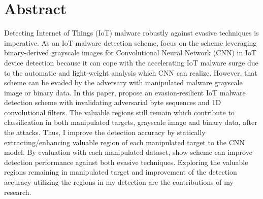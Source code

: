 \section*{Abstract}


Detecting Internet of Things (IoT) malware robustly against evasive techniques is imperative.
As an IoT malware detection scheme, \we focus on the scheme leveraging binary-derived grayscale images for Convolutional Neural Network (CNN) in IoT device detection because it can cope with the accelerating IoT malware surge due to the automatic and light-weight analysis which CNN can realize.
However, that scheme can be evaded by the adversary with manipulated malware grayscale image or binary data.
In this paper, \we propose an evasion-resilient IoT malware detection scheme with invalidating adversarial byte sequences and 1D convolutional filters.
The valuable regions still remain which contribute to classification in both manipulated targets, grayscale image and binary data, after the attacks.
Thus, I improve the detection accuracy by statically extracting/enhancing valuable region of each manipulated target to the CNN model.
By evaluation with each manipulated dataset, \we show \our scheme can improve detection performance against both evasive techniques. 
Exploring the valuable regions remaining in manipulated target and improvement of the detection accuracy utilizing the regions in my detection are the contributions of my research. 
